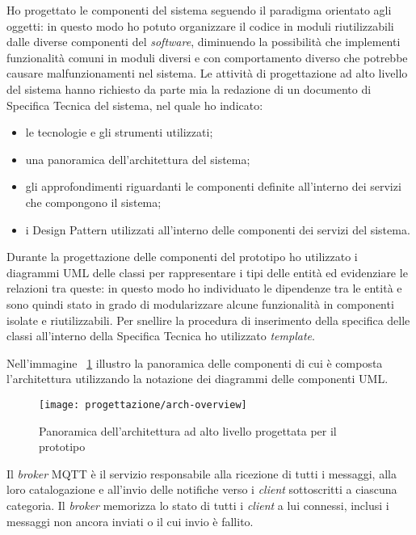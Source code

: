 Ho progettato le componenti del sistema seguendo il paradigma orientato agli oggetti: in questo modo ho potuto organizzare il codice in moduli riutilizzabili dalle diverse componenti del \emph{software}, diminuendo la possibilità che implementi funzionalità comuni in moduli diversi e con comportamento diverso che potrebbe causare malfunzionamenti nel sistema.
Le attività di progettazione ad alto livello del sistema hanno richiesto da parte mia la redazione di un documento di Specifica Tecnica del sistema, nel quale ho indicato:
\begin{itemize}
  \item le tecnologie e gli strumenti utilizzati;
  \item una panoramica dell'architettura del sistema;
  \item gli approfondimenti riguardanti le componenti definite all'interno dei servizi che compongono il sistema;
  \item i Design Pattern utilizzati all'interno delle componenti dei servizi del sistema.
\end{itemize}

Durante la progettazione delle componenti del prototipo ho utilizzato i diagrammi UML delle classi per rappresentare i tipi delle entità ed evidenziare le relazioni tra queste: in questo modo ho individuato le dipendenze tra le entità e sono quindi stato in grado di modularizzare alcune funzionalità in componenti isolate e riutilizzabili.
Per snellire la procedura di inserimento della specifica delle classi all'interno della Specifica Tecnica ho utilizzato \emph{template}.

Nell'immagine ~\ref{img:overview-arch} illustro la panoramica delle componenti di cui è composta l'architettura utilizzando la notazione dei diagrammi delle componenti UML.

\begin{figure}[H]
    \centering
    \texttt{[image: progettazione/arch-overview]}
    \caption{Panoramica dell'architettura ad alto livello progettata per il prototipo}
    \label{img:overview-arch}
\end{figure}

Il \emph{broker} MQTT è il servizio responsabile alla ricezione di tutti i messaggi, alla loro catalogazione e all'invio delle notifiche verso i \emph{client} sottoscritti a ciascuna categoria.
Il \emph{broker} memorizza lo stato di tutti i \emph{client} a lui connessi, inclusi i messaggi non ancora inviati o il cui invio è fallito.

